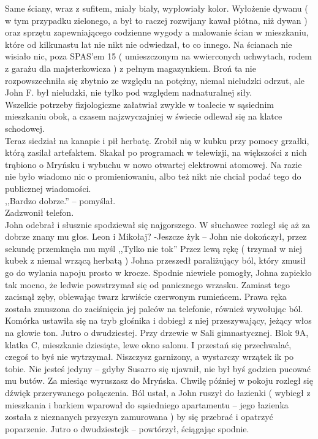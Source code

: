 \documentclass[../MAIN.tex]{subfiles}
\begin{document}
Same ściany, wraz z sufitem, miały biały, wypłowiały kolor. Wyłożenie dywanu ( w tym przypadku zielonego, a był to raczej rozwijany kawał płótna, niż dywan ) oraz sprzętu zapewniającego codzienne wygody a malowanie ścian w mieszkaniu, które od kilkunastu lat nie nikt nie odwiedzał, to co innego. Na ścianach nie wisiało nic, poza SPAS’em 15 ( umieszczonym na wwierconych uchwytach, rodem z garażu dla majsterkowicza ) z pełnym magazynkiem. Broń ta nie rozpowszechniła się zbytnio ze względu na potężny, niemal nieludzki odrzut, ale John F. był nieludzki, nie tylko pod względem nadnaturalnej siły. \\
Wszelkie potrzeby fizjologiczne załatwiał zwykle w toalecie w sąsiednim mieszkaniu obok, a czasem najzwyczajniej w świecie odlewał się na klatce schodowej. \\
Teraz siedział na kanapie i pił herbatę. Zrobił nią w kubku przy pomocy grzałki, którą zasilał artefaktem. Skakał po programach w telewizji, na większości z nich trąbiono o Mryńsku i wybuchu w nowo otwartej elektrowni atomowej. Na razie nie było wiadomo nic o promieniowaniu, albo też nikt nie chciał podać tego do publicznej wiadomości. \\
,,Bardzo dobrze.'' -- pomyślał.\\
Zadzwonił telefon. \\
John odebrał i słusznie spodziewał się najgorszego. W słuchawce rozległ się aż za dobrze znany mu głos.
\sx Leon i Mikołaj?
-Jeszcze ży\3k -- John nie dokończył, przez sekundę przemknęła mu myśl ,,Tylko nie to\3k''
\qd
Przez lewą rękę ( trzymał w niej kubek z niemal wrzącą herbatą ) Johna przeszedł paraliżujący ból, który zmusił go do wylania napoju prosto w krocze. Spodnie niewiele pomogły, Johna zapiekło tak mocno, że ledwie powstrzymał się od panicznego wrzasku. Zamiast tego zacisnął zęby, oblewając twarz krwiście czerwonym rumieńcem. Prawa ręka została zmuszona do zaciśnięcia jej palców na telefonie, również wywołując ból. Komórka ustawiła się na tryb głośnika i dobiegł z niej przeszywający, jeżący włos na głowie ton.
\sx Jutro o dwudziestej. Przy drzewie w Sali gimnastycznej. Blok 9A, klatka C, mieszkanie dziesiąte, lewe okno salonu. I przestań się przechwalać, czegoś to byś nie wytrzymał. Niszczysz garnizony, a wystarczy wrzątek i\3k po tobie. Nie jesteś jedyny -- gdyby Susarro się ujawnił, nie był byś godzien pucować mu butów. Za miesiąc wyruszasz do Mryńska.
\qd
Chwilę później w pokoju rozległ się dźwięk przerywanego połączenia. Ból ustał, a John ruszył do łazienki ( wybiegł z mieszkania i barkiem wparował do sąsiedniego apartamentu -- jego łazienka została z nieznanych przyczyn zamurowana ) by się przebrać i opatrzyć poparzenie.
\sx Jutro o dwudziestej\3k -- powtórzył, ściągając spodnie. \qd
\end{document}
